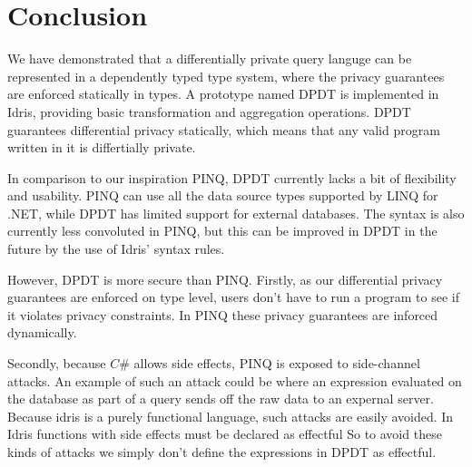 \documentclass[12pt]{article}
\begin{document}

\section{Conclusion}\label{sec:conclusion}

We have demonstrated that a differentially private query languge can be represented in a dependently typed type system, where the privacy guarantees are enforced statically in types.
A prototype named DPDT is implemented in Idris, providing basic transformation and aggregation operations.
DPDT guarantees differential privacy statically, which means that any valid program written in it is differtially private.

In comparison to our inspiration PINQ, DPDT currently lacks a bit of flexibility and usability.
PINQ can use all the data source types supported by LINQ for .NET, while DPDT has limited support for external databases.
The syntax is also currently less convoluted in PINQ, but this can be improved in DPDT in the future by the use of Idris' syntax rules.

However, DPDT is more secure than PINQ.
Firstly, as our differential privacy guarantees are enforced on type level, users don't have to run a program to see if it violates privacy constraints.
In PINQ these privacy guarantees are inforced dynamically.

Secondly, because $C\#$ allows side effects, PINQ is exposed to side-channel attacks.
An example of such an attack could be where an expression evaluated on the database as part of a query sends off the raw data to an expernal server.
Because idris is a purely functional language, such attacks are easily avoided.
In Idris functions with side effects must be declared as effectful
So to avoid these kinds of attacks we simply don't define the expressions in DPDT as effectful.



\end{document}
